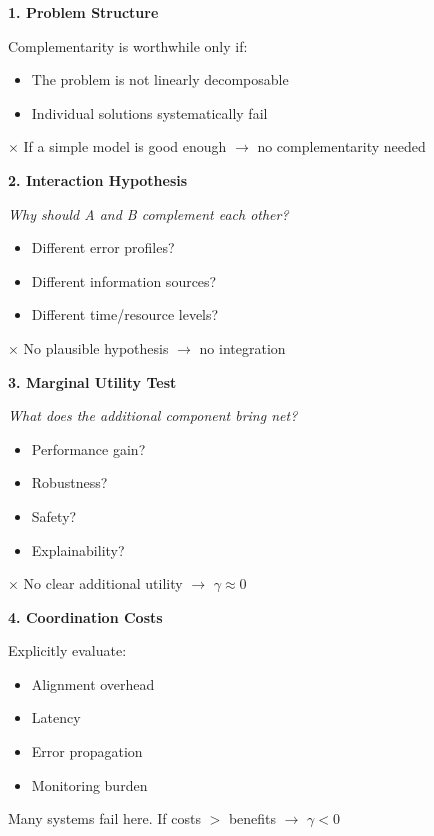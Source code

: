 \begin{tcolorbox}[colback=yellow!5!white, colframe=yellow!75!black,
    title=The Seven Questions]

\textbf{1. Problem Structure}

Complementarity is worthwhile only if:
\begin{itemize}[nosep]
    \item The problem is not linearly decomposable
    \item Individual solutions systematically fail
\end{itemize}
$\times$ If a simple model is good enough $\rightarrow$ no complementarity needed

\vspace{0.5em}
\textbf{2. Interaction Hypothesis}

\textit{Why should A and B complement each other?}
\begin{itemize}[nosep]
    \item Different error profiles?
    \item Different information sources?
    \item Different time/resource levels?
\end{itemize}
$\times$ No plausible hypothesis $\rightarrow$ no integration

\vspace{0.5em}
\textbf{3. Marginal Utility Test}

\textit{What does the additional component bring net?}
\begin{itemize}[nosep]
    \item Performance gain?
    \item Robustness?
    \item Safety?
    \item Explainability?
\end{itemize}
$\times$ No clear additional utility $\rightarrow$ $\gamma \approx 0$

\vspace{0.5em}
\textbf{4. Coordination Costs}

Explicitly evaluate:
\begin{itemize}[nosep]
    \item Alignment overhead
    \item Latency
    \item Error propagation
    \item Monitoring burden
\end{itemize}
Many systems fail here. If costs $>$ benefits $\rightarrow$ $\gamma < 0$


\end{tcolorbox}

